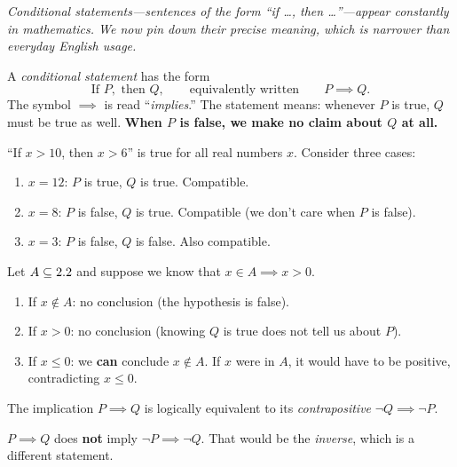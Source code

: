 \textit{Conditional statements---sentences of the form ``if \ldots, then \ldots''---appear constantly in mathematics.  We now pin down their precise meaning, which is narrower than everyday English usage.}

\begin{definition}
\label{def:1-9}
A \emph{conditional statement} has the form
\[
  \text{If } P, \text{ then } Q, \qquad\text{equivalently written}\qquad P \implies Q.
\]
The symbol $\implies$ is read ``\emph{implies}.''  The statement means: whenever $P$ is true, $Q$ must be true as well.  \textbf{When $P$ is false, we make no claim about $Q$ at all.}
\end{definition}

\begin{example}
\label{ex:1-8}
``If $x > 10$, then $x > 6$'' is true for all real numbers $x$.  Consider three cases:
\begin{enumerate}[label=(\roman*)]
  \item $x = 12$: $P$ is true, $Q$ is true.  Compatible.
  \item $x = 8$: $P$ is false, $Q$ is true.  Compatible (we don't care when $P$ is false).
  \item $x = 3$: $P$ is false, $Q$ is false.  Also compatible.
\end{enumerate}
\end{example}

\begin{example}
\label{ex:1-9}
Let $A \subseteq 2.2$ and suppose we know that $x \in A \implies x > 0$.

\begin{enumerate}[label=(\alph*)]
  \item If $x \notin A$: no conclusion (the hypothesis is false).
  \item If $x > 0$: no conclusion (knowing $Q$ is true does not tell us about $P$).
  \item If $x \le 0$: we \textbf{can} conclude $x \notin A$.  If $x$ were in $A$, it would have to be positive, contradicting $x \le 0$.
\end{enumerate}
\end{example}

\begin{theorem}[Contrapositive]
\label{thm:1-6}
The implication $P \implies Q$ is logically equivalent to its \emph{contrapositive} $\lnot Q \implies \lnot P$.
\end{theorem}

\begin{remark}[Warning]
$P \implies Q$ does \textbf{not} imply $\lnot P \implies \lnot Q$.  That would be the \emph{inverse}, which is a different statement.
\end{remark}

